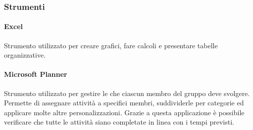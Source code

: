 \subsubsection{Strumenti}
\paragraph{Excel}
Strumento utilizzato per creare grafici, fare calcoli e presentare tabelle organizzative.
\paragraph{Microsoft Planner}
Strumento utilizzato per gestire le  che ciascun membro del gruppo deve svolgere. Permette di assegnare attività a specifici membri, suddividerle per categorie ed applicare molte altre personalizzazioni. Grazie a questa applicazione è possibile verificare che tutte le attività siano completate in linea con i tempi previsti.